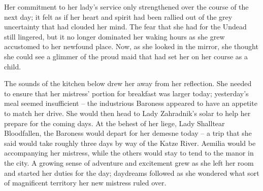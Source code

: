  

Her commitment to her lady’s service only strengthened over the course of the next day; it felt as if her heart and spirit had been rallied out of the grey uncertainty that had clouded her mind. The fear that she had for the Undead still lingered, but it no longer dominated her waking hours as she grew accustomed to her newfound place. Now, as she looked in the mirror, she thought she could see a glimmer of the proud maid that had set her on her course as a child.

 

The sounds of the kitchen below drew her away from her reflection. She needed to ensure that her mistress’ portion for breakfast was larger today; yesterday’s meal seemed insufficient – the industrious Baroness appeared to have an appetite to match her drive. She would then head to Lady Zahradnik’s solar to help her prepare for the coming days. At the behest of her liege, Lady Shalltear Bloodfallen, the Baroness would depart for her demesne today – a trip that she said would take roughly three days by way of the Katze River. Aemilia would be accompanying her mistress, while the others would stay to tend to the manor in the city. A growing sense of adventure and excitement grew as she left her room and started her duties for the day; daydreams followed as she wondered what sort of magnificent territory her new mistress ruled over.